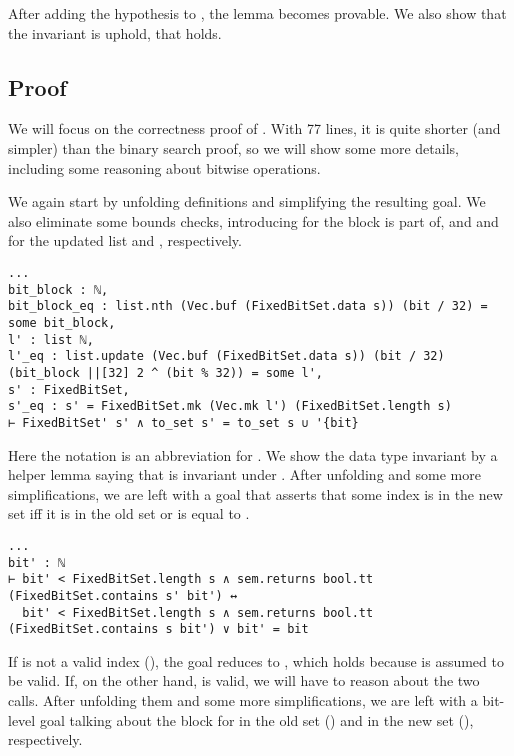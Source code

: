 After adding the hypothesis \lean{[FixedBitSet' s]} to , the
lemma becomes provable. We also show that the invariant is uphold, \ie that
 holds.

\subsection{Proof}

We will focus on the correctness proof of . With 77 lines, it is
quite shorter (and simpler) than the binary search proof, so we will show some
more details, including some reasoning about bitwise operations.

We again start by unfolding definitions and simplifying the resulting goal. We
also eliminate some bounds checks, introducing  for the  block
 is part of, and  and  for the updated list and
, respectively.

\begin{verbatim}
...
bit_block : ℕ,
bit_block_eq : list.nth (Vec.buf (FixedBitSet.data s)) (bit / 32) = some bit_block,
l' : list ℕ,
l'_eq : list.update (Vec.buf (FixedBitSet.data s)) (bit / 32) (bit_block ||[32] 2 ^ (bit % 32)) = some l',
s' : FixedBitSet,
s'_eq : s' = FixedBitSet.mk (Vec.mk l') (FixedBitSet.length s)
⊢ FixedBitSet' s' ∧ to_set s' = to_set s ∪ '{bit}
\end{verbatim}

Here the notation \lean{||[32]} is an abbreviation for . We show the data type invariant by a helper lemma saying that
 is invariant under . After unfolding
 and some more simplifications, we are left with a
goal that asserts that some index  is in the new set iff it is in
the old set or is equal to .

\begin{verbatim}
...
bit' : ℕ
⊢ bit' < FixedBitSet.length s ∧ sem.returns bool.tt (FixedBitSet.contains s' bit') ↔
  bit' < FixedBitSet.length s ∧ sem.returns bool.tt (FixedBitSet.contains s bit') ∨ bit' = bit
\end{verbatim}

If  is not a valid index (), the
goal reduces to , which holds because  is assumed to
be valid. If, on the other hand,  is valid, we will have to reason
about the two  calls. After unfolding them and some more
simplifications, we are left with a bit-level goal talking about the
 block for  in the old set () and in the
new set (), respectively.

